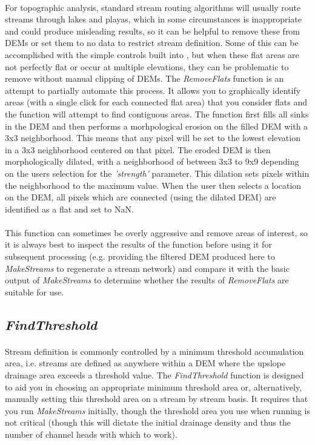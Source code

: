 \paragraph{}For topographic analysis, standard stream routing algorithms will usually route streams through lakes and playas, which in some circumstances is inappropriate and could produce misleading results, so it can be helpful to remove these from DEMs or set them to no data to restrict stream definition. Some of this can be accomplished with the simple controls built into , but when these flat areas are not perfectly flat or occur at multiple elevations, they can be problematic to remove without manual clipping of DEMs. The \textit{RemoveFlats} function is an attempt to partially automate this process. It allows you to graphically identify areas (with a single click for each connected flat area) that you consider flats and the function will attempt to find contiguous areas. The function first fills all sinks in the DEM and then performs a morhpological erosion on the filled DEM with a 3x3 neighborhood. This means that any pixel will be set to the lowest elevation in a 3x3 neighborhood centered on that pixel. The eroded DEM is then morphologically dilated, with a neighborhood of between 3x3 to 9x9 depending on the users selection for the \textit{'strength'} parameter. This dilation sets pixels within the neighborhood to the maximum value. When the user then selects a location on the DEM, all pixels which are connected (using the dilated DEM) are identified as a flat and set to NaN.

\paragraph{}This function can sometimes be overly aggressive and remove areas of interest, so it is always best to inspect the results of the function before using it for subsequent processing (e.g. providing the filtered DEM produced here to \textit{MakeStreams} to regenerate a stream network) and compare it with the basic output of \textit{MakeStreams} to determine whether the results of \textit{RemoveFlats} are suitable for use.

\subsection{\textit{FindThreshold}} \label{sec:FindThresh}

\paragraph{}Stream definition is commonly controlled by a minimum threshold accumulation area, i.e. streams are defined as anywhere within a DEM where the upslope drainage area exceeds a threshold value. The \textit{FindThreshold} function is designed to aid you in choosing an appropriate minimum threshold area or, alternatively, manually setting this threshold area on a stream by stream basis. It requires that you run \textit{MakeStreams} initially, though the threshold area you use when running  is not critical (though this will dictate the initial drainage density and thus the number of channel heads with which to work). 

